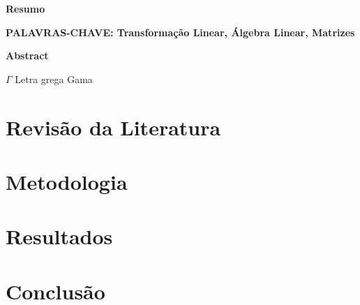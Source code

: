 \documentclass[12pt, a4paper,
 chapter=TITLE,
  section=TITLE,
   subsection=TITLE,
    subsubsection=TITLE]{abntex2}
\begin{document}
	\newpage
	
	\begin{center}
		\textbf{Resumo}
		
		\vspace{0.5cm}
		

		
		
	\end{center}
	
	\vspace{0.5cm}
	
	\textbf{PALAVRAS-CHAVE: Transformação Linear, Álgebra Linear, Matrizes}
	
	\newpage
	
	\begin{center}
		\textbf{Abstract}
		
		\vspace{1cm}
		

		
	\end{center}
	
	
	\newpage
	
	\listoffigures
	
	\newpage
	
	\listoftables
	
	\newpage
	
	\begin{simbolos}
		\item[$ \Gamma $] Letra grega Gama
	\end{simbolos}
	
	
	\tableofcontents
	
	
	\textual
	
	
		
	
	\chapter{Revisão da Literatura}
	

	
	\chapter{Metodologia}
		\lipsum[1-2]
		

	
	\chapter{Resultados}
	

	
	\chapter{Conclusão}
		\lipsum[1]
		
		
	
		
\end{document}

